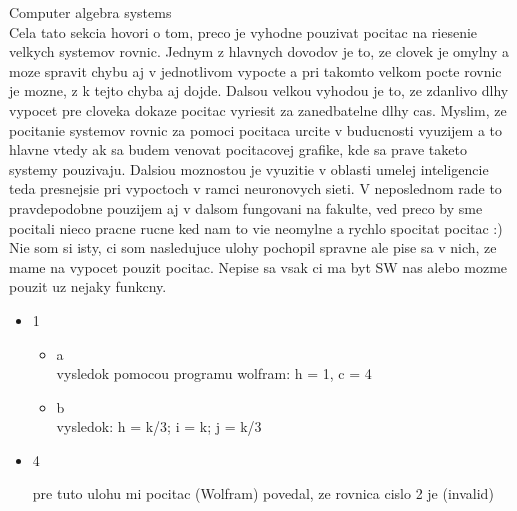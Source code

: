 \documentclass{article}
\begin{document}
Computer algebra systems \\
Cela tato sekcia hovori o tom, preco je vyhodne pouzivat pocitac na riesenie velkych systemov rovnic.
Jednym z hlavnych dovodov je to, ze clovek je omylny a moze spravit chybu aj v jednotlivom vypocte a pri takomto velkom pocte rovnic je mozne,
z k tejto chyba aj dojde. Dalsou velkou vyhodou je to, ze zdanlivo dlhy vypocet pre cloveka dokaze pocitac vyriesit za zanedbatelne dlhy cas.
Myslim, ze pocitanie systemov rovnic za pomoci pocitaca urcite v buducnosti vyuzijem a to hlavne vtedy ak sa budem venovat pocitacovej grafike,
kde sa prave taketo systemy pouzivaju. Dalsiou moznostou je vyuzitie v oblasti umelej inteligencie teda presnejsie pri vypoctoch v ramci neuronovych sieti.
V neposlednom rade to pravdepodobne pouzijem aj v dalsom fungovani na fakulte, ved preco by sme pocitali nieco pracne rucne ked nam to vie neomylne a rychlo spocitat pocitac :) \\
Nie som si isty, ci som nasledujuce ulohy pochopil spravne ale pise sa v nich, ze mame na vypocet pouzit pocitac. Nepise sa vsak ci ma byt SW nas alebo mozme pouzit uz nejaky funkcny.
\begin{itemize}
    \item 1 \begin{itemize}
        \item a\\
                vysledok pomocou programu wolfram: h = 1, c = 4
        \item b\\
                vysledok: h = k/3; i = k; j = k/3
    \end{itemize}
    \item 4 \begin{itemize}
        pre tuto ulohu mi pocitac (Wolfram) povedal, ze rovnica cislo 2 je (invalid)
    \end{itemize}
\end{itemize}
\end{document}
